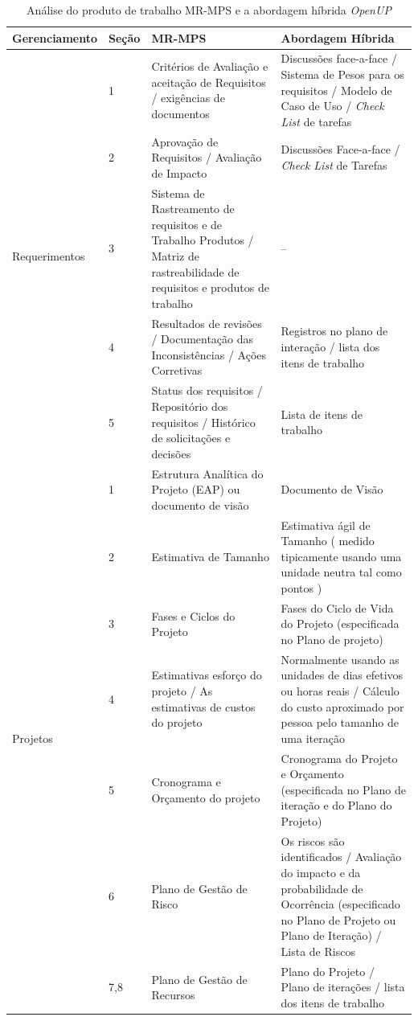 \documentclass{acm_proc_article-sp}
\begin{document}
\begin{table}[h]
\scriptsize
\caption{Análise do produto de trabalho MR-MPS e a abordagem híbrida \textit{OpenUP} \cite{Arimoto:melhoria}} 
\centering
\begin{tabular}{|p{20mm}|p{10mm}|p{60mm}|p{60mm}|}
\hline
Gerenciamento & Seção & MR-MPS & Abordagem Híbrida \\
\hline
\multirow{5}{*}{Requerimentos} & 1 & Critérios de Avaliação e aceitação de Requisitos / exigências de documentos & 
Discussões face-a-face / Sistema de Pesos para os requisitos / Modelo de Caso de Uso / \textit{Check List} de tarefas\\
& 2 & Aprovação de Requisitos / Avaliação de Impacto & Discussões Face-a-face / \textit{Check List} de Tarefas \\
& 3 & Sistema de Rastreamento de requisitos e de Trabalho Produtos / Matriz de rastreabilidade de requisitos e produtos de trabalho
& -- \\
& 4 & Resultados de revisões / Documentação das Inconsistências / Ações Corretivas & Registros no plano de interação / lista dos itens de trabalho \\
& 5 & Status dos requisitos / Repositório dos requisitos / Histórico de solicitações e decisões & Lista de itens de trabalho \\
\hline
\multirow{14}{*}{Projetos} & 1 & Estrutura Analítica do Projeto (EAP) ou documento de visão & Documento de Visão \\
& 2 & Estimativa de Tamanho &  Estimativa ágil de Tamanho ( medido tipicamente usando uma unidade neutra tal como pontos ) \\
& 3 & Fases e Ciclos do Projeto & Fases do Ciclo de Vida do Projeto (especificada no Plano de projeto) \\
& 4 & Estimativas esforço do projeto / As estimativas de custos do projeto & Normalmente usando as unidades de dias efetivos ou horas reais / Cálculo do custo aproximado por pessoa pelo tamanho de uma iteração \\
& 5 & Cronograma e Orçamento do projeto & Cronograma do Projeto e Orçamento (especificada no Plano de iteração e do Plano do Projeto) \\
& 6 & Plano de Gestão de Risco & Os riscos são identificados / Avaliação do impacto e da probabilidade de Ocorrência (especificado no Plano de Projeto ou Plano de Iteração) / Lista de Riscos \\
& 7,8 & Plano de Gestão de Recursos & Plano do Projeto / Plano de iterações / lista dos itens de trabalho \\

\end{tabular}
\end{table}
\end{document}
